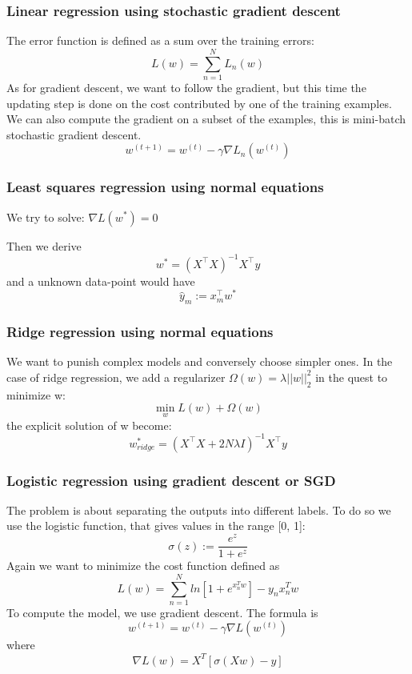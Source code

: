 \documentclass[10pt,conference,compsocconf]{IEEEtran}
\begin{document}
	\subsubsection{Linear regression using stochastic gradient descent}
	
	The error function is defined as a sum over the training errors: \\
	$$ L(w) = \sum\limits_{n=1}^N L_n(w)$$
	As for gradient descent, we want to follow the gradient, but this time the updating step is done on the cost contributed by one of the training examples. We can also compute the gradient on a subset of the examples, this is mini-batch stochastic gradient descent.
	$$w^{(t+1)}=w^{(t)} -\gamma \nabla L_n(w^{(t)})$$
	
	
	\subsubsection{Least squares regression using normal equations}
	
	We try to solve: $\nabla L(w^*) = 0$
	
	Then we derive
	$$w^* = (X^\top X)^{-1}X^\top y$$
	and a unknown data-point would have 
	$$\hat y_m := x_m^\top w^*$$
	
	\subsubsection{Ridge regression using normal equations}
	
	We want to punish complex models and conversely choose simpler ones.
	In the case of ridge regression, we add a regularizer $\Omega(w) = \lambda||w||_2^2$ in the quest to minimize w:
	$$\min\limits_{w} L(w) + \Omega(w)$$
	the explicit solution of w become:
	$$w_{ridge}^* = (X^\top X+2N\lambda I)^{-1}X^\top y$$
	\subsubsection{Logistic regression using gradient descent or SGD}
	
	The problem is about separating the outputs into different labels. To do so we use the logistic function, that gives values in the range [0, 1]:
	$$\sigma(z) := \frac{e^z}{1 + e^z}$$
	Again we want to minimize the cost function defined as 
	$$ L(w) = \sum\limits_{n=1}^N ln[1 + e^{x_n^Tw}] - y_nx_n^Tw$$
	To compute the model, we use gradient descent. The formula is 
	$$w^{(t+1)}=w^{(t)} -\gamma \nabla L(w^{(t)})$$
	where  $$\nabla L(w) = X^T[\sigma(Xw) - y]$$ 
	
\end{document}

